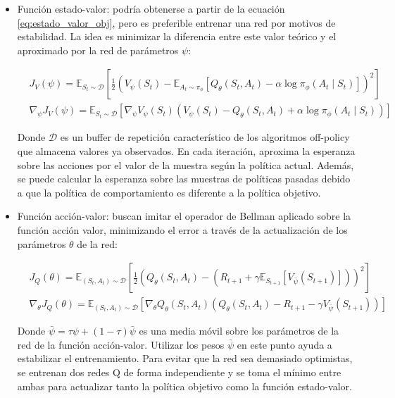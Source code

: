 \documentclass[11pt,a4paper]{article}
\begin{document}
		\begin{itemize}
			\item Función estado-valor: podría obtenerse a partir de la ecuación \ref{eq:estado_valor_obj}, pero es preferible entrenar una red por motivos de estabilidad. La idea es minimizar la diferencia entre este valor teórico y el aproximado por la red de parámetros $\psi$:
			
			\begin{align}
			& J_V(\psi) = \mathbb{E}_{S_t \sim \mathcal{D}} \left[ \frac{1}{2} \left( V_\psi(S_t) - \mathbb{E}_{A_t \sim \pi_\phi} \left[ Q_\theta(S_t, A_t) - \alpha \log \pi_\phi(A_t \mid S_t) \right] \right)^2 \right] \\
			& \nabla_\psi J_V(\psi) = \mathbb{E}_{S_t \sim \mathcal{D}} \left[ \nabla_\psi V_\psi(S_t) \left( V_\psi(S_t) - Q_\theta(S_t, A_t) + \alpha \log \pi_\phi(A_t \mid S_t) \right) \right]
			\end{align}
			
			Donde $\mathcal{D}$ es un buffer de repetición característico de los algoritmos off-policy que almacena valores ya observados. En cada iteración, aproxima la esperanza sobre las acciones por el valor de la muestra según la política actual. Además, se puede calcular la esperanza sobre las muestras de políticas pasadas debido a que la política de comportamiento es diferente a la política objetivo.
			
			\item Función acción-valor: buscan imitar el operador de Bellman aplicado sobre la función acción valor, minimizando el error a través de la actualización de los parámetros $\theta$ de la red:
			
			\begin{align}
			& J_Q(\theta) = \mathbb{E}_{(S_t, A_t) \sim \mathcal{D}} \left[ \frac{1}{2} \left( Q_\theta(S_t, A_t) - \left( R_{t+1} + \gamma \mathbb{E}_{S_{t+1}} \left[ V_{\bar{\psi}}(S_{t+1}) \right] \right) \right)^2 \right] \\
			& \nabla_\theta J_Q(\theta) = \mathbb{E}_{(S_t, A_t) \sim \mathcal{D}} \left[ \nabla_\theta Q_\theta(S_t, A_t) \left( Q_\theta(S_t, A_t) - R_{t+1} - \gamma V_{\bar{\psi}}(S_{t+1}) \right) \right]
			\end{align}
			
			Donde $\bar{\psi} = \tau \psi + (1 - \tau)\bar{\psi}$ es una media móvil sobre los parámetros de la red de la función acción-valor. Utilizar los pesos $\bar{\psi}$ en este punto ayuda a estabilizar el entrenamiento. Para evitar que la red sea demasiado optimistas, se entrenan dos redes Q de forma independiente y se toma el mínimo entre ambas para actualizar tanto la política objetivo como la función estado-valor.
			

\end{itemize}
\end{document}
